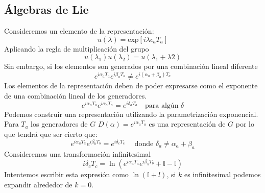 \documentclass[a4paper,12pt]{article}
\begin{document}
\subsection{Álgebras de Lie}

Consideremos un elemento de la representación: 
\[
u(\lambda) = \text{exp} [i \lambda \epsilon_a T_a]
\]
Aplicando la regla de multiplicación del grupo
\[
u(\lambda_1) u(\lambda_2) = u(\lambda_1+\lambda2)
\]
Sin embargo, si los elementos son generados por una combinación lineal diferente
\[
e^{i \alpha_aT_a} e^{i \beta_aT_a} \not= e^{i (\alpha_a 
 + \beta_a)T_a}
\]
Los elementos de la representación deben de poder expresarse como el  exponente de una combinación lineal de los generadores. 
\[
e^{i \alpha_aT_a} e^{i \alpha_aT_a} = e^{i \delta_aT_a} \quad \text{para algún } \delta
\]
Podemos construir una representación utilizando la parametrización exponencial. Para $T_a$ los generadores de $G$ $D(\alpha) = e^{i \alpha_aT_a}$ es una representación de $G$ por lo que tendrá que ser cierto que: 
\[
e^{i \alpha_aT_a} e^{i \beta_bT_b} = e^{i \delta_cT_c}\quad \text{ donde } \delta_a \not = \alpha_a+\beta_a
\]
Consideremos una transformación infinitesimal
\[
i \delta_cT_c = \ln (e^{i \alpha_aT_a} e^{i \beta_bT_b} + \mathbb{I} - \mathbb{I}  )
\]
Intentemos escribir esta expresión como $\ln ( \mathbb{I} + l)$, si $k$ es infinitesimal podemos expandir alrededor de $k=0$. 
\end{document}
